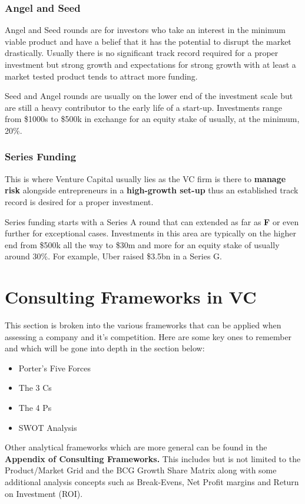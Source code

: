 \documentclass[a4paper]{article}
\begin{document}
{\subsubsection{Angel and Seed}
Angel and Seed rounds are for investors who take an interest in the minimum viable product and have a belief that it has the potential to disrupt the market drastically. Usually there is no significant track record required for a proper investment but strong growth and expectations for strong growth with at least a market tested product tends to attract more funding.

\vspace{5pt}
\noindent Seed and Angel rounds are usually on the lower end of the investment scale but are still a heavy contributor to the early life of a start-up. Investments range from \$1000s to \$500k in exchange for an equity stake of usually, at the minimum, 20\%.

\subsubsection{Series Funding}
This is where Venture Capital usually lies as the VC firm is there to \textbf{manage risk} alongside entrepreneurs in a \textbf{high-growth set-up} thus an established track record is desired for a proper investment.

\vspace{5pt}
\noindent Series funding starts with a Series A round that can extended as far as \textbf{F} or even further for exceptional cases. Investments in this area are typically on the higher end from \$500k all the way to \$30m and more for an equity stake of usually around 30\%. For example, Uber raised \$3.5bn in a Series G.

\newpage
\section{Consulting Frameworks in VC}
This section is broken into the various frameworks that can be applied when assessing a company and it's competition. Here are some key ones to remember and which will be gone into depth in the section below:
\begin{itemize}
	\item Porter's Five Forces
	\item The 3 Cs
	\item The 4 Ps
	\item SWOT Analysis
\end{itemize}
Other analytical frameworks which are more general can be found in the \textbf{Appendix of Consulting Frameworks.} This includes but is not limited to the Product/Market Grid and the BCG Growth Share Matrix along with some additional analysis concepts such as Break-Evens, Net Profit margins and Return on Investment (ROI).

}
\end{document}
